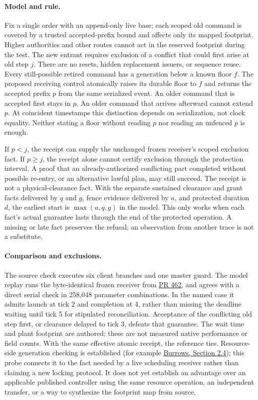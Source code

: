 \documentclass{article}
\begin{document}
\paragraph{Model and rule.}
Fix a single order with an append-only live base; each scoped old command is covered by a trusted accepted-prefix bound and affects only its mapped footprint. Higher authorities and other routes cannot act in the reserved footprint during the test. The new entrant requires exclusion of a conflict that could first arise at old step $j$. There are no resets, hidden replacement issuers, or sequence reuse. Every still-possible retired command has a generation below a known floor $f$. The proposed receiving control atomically raises its durable floor to $f$ and returns the accepted prefix $p$ from the same serialized event. An older command that is accepted first stays in $p$. An older command that arrives afterward cannot extend $p$. At coincident timestamps this distinction depends on serialization, not clock equality. Neither stating a floor without reading $p$ nor reading an unfenced $p$ is enough.

If $p<j$, the receipt can supply the unchanged frozen receiver's scoped exclusion fact. If $p\ge j$, the receipt alone cannot certify exclusion through the protection interval. A proof that an already-authorized conflicting part completed without possible re-entry, or an alternative lawful plan, may still succeed. The receipt is not a physical-clearance fact. With the separate sustained clearance and grant facts delivered by $q$ and $g$, fence evidence delivered by $a$, and protected duration $d$, the earliest start is $\max(a,q,g)$ in the model. This only works when each fact's actual guarantee lasts through the end of the protected operation. A missing or late fact preserves the refusal; an observation from another trace is not a substitute.

\paragraph{Comparison and exclusions.}
The source check executes six client branches and one master guard. The model replay runs the byte-identical frozen receiver from \href{https://github.com/eternal-november/eos-research-programmes/pull/462}{PR 462}, and agrees with a direct serial check in 258,048 parameter combinations. In the named case it admits launch at tick 2 and completion at 4, rather than missing the deadline waiting until tick 5 for stipulated reconciliation. Acceptance of the conflicting old step first, or clearance delayed to tick 3, defeats that guarantee. The wait time and plant footprint are authored; these are not measured native performance or field counts. With the same effective atomic receipt, the reference ties. Resource-side generation checking is established (for example \href{https://static.usenix.org/events/osdi06/tech/full_papers/burrows/burrows_html/}{Burrows, Section 2.4}); this probe connects it to the fact needed by a live scheduling receiver rather than claiming a new locking protocol. It does not yet establish an advantage over an applicable published controller using the same resource operation, an independent transfer, or a way to synthesize the footprint map from source.
\end{document}
